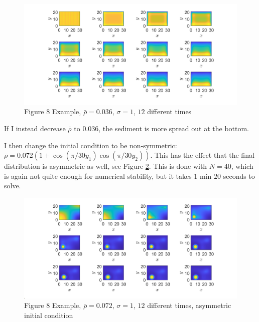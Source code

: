 \documentclass[11pt, a4paper]{article}
\theoremstyle{definition}
\begin{document}
\begin{figure}[h]
	\centering
	\includegraphics[scale=0.35]{Ex8F1b.png}
	\caption{Figure 8 Example, $\bar \rho = 0.036$, $\sigma = 1$, $12$ different times} 
	\label{F1b}
\end{figure}
If I instead decrease $\bar \rho$  to $0.036$, the sediment is more spread out at the bottom.

I then change the initial condition to be non-symmetric: $\bar \rho = 0.072 (1 + \cos(\pi / 30 y_1)\cos(\pi / 30 y_2))$. This has the effect that the final distribution is asymmetric as well, see Figure \ref{Fx}. This is done with $N = 40$, which is again not quite enough for numerical stability, but it takes $1$ min $20$ seconds to solve.
\begin{figure}[h]
	\centering
	\includegraphics[scale=0.4]{Ex8NonSym.png}
	\caption{Figure 8 Example, $\bar \rho = 0.072$, $\sigma = 1$, $12$ different times, asymmetric initial condition} 
	\label{Fx}
\end{figure}
\end{document}
